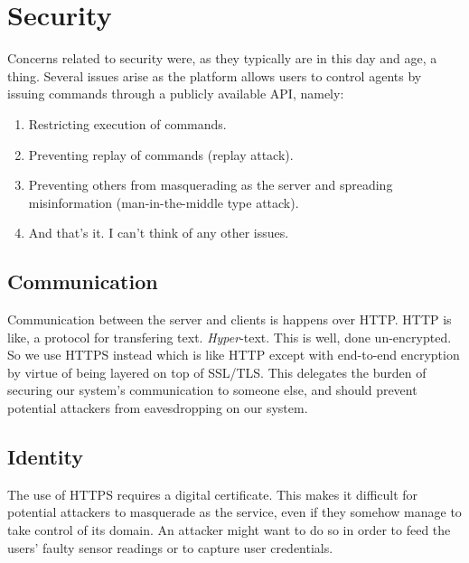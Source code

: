 \section{Security}
Concerns related to security were, as they typically are in this day and age, a thing.
Several issues arise as the platform allows users to control agents by issuing commands through a publicly available API, namely:

\begin{enumerate}
	\item Restricting execution of commands.
	\item Preventing replay of commands (replay attack).
	\item Preventing others from masquerading as the server and spreading misinformation (man-in-the-middle type attack).
	\item And that's it. I can't think of any other issues.
\end{enumerate}


\subsection{Communication}
Communication between the server and clients is happens over HTTP.
HTTP is like, a protocol for transfering text.
\emph{Hyper}-text.
This is well, done un-encrypted.
So we use HTTPS instead which is like HTTP except with end-to-end encryption by virtue of being layered on top of SSL/TLS.
This delegates the burden of securing our system's communication to someone else, and should prevent potential attackers from eavesdropping on our system.

\subsection{Identity}
The use of HTTPS requires a digital certificate. %
This makes it difficult for potential attackers to masquerade as the service, even if they somehow manage to take control of its domain.
An attacker might want to do so in order to feed the users' faulty sensor readings or to capture user credentials.

